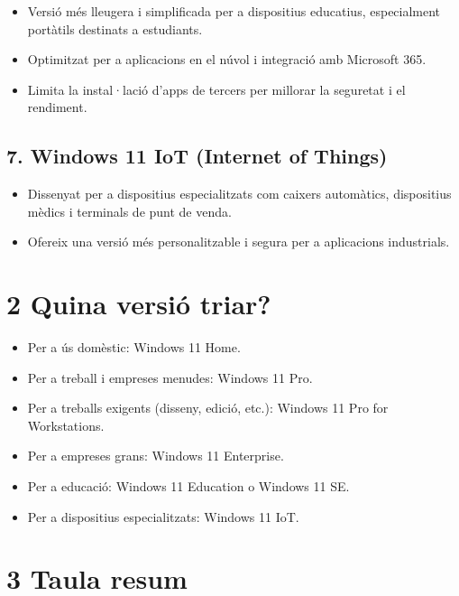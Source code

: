 \documentclass[
  12 pt,
  a4paper,
]{article}
\providecommand{\tightlist}{%
  \setlength{\itemsep}{0pt}\setlength{\parskip}{0pt}}
\begin{document}
\begin{itemize}
\tightlist
\item
  Versió més lleugera i simplificada per a dispositius educatius,
  especialment portàtils destinats a estudiants.
\item
  Optimitzat per a aplicacions en el núvol i integració amb Microsoft
  365.
\item
  Limita la instal·lació d'apps de tercers per millorar la seguretat i
  el rendiment.
\end{itemize}

\subsection{7. Windows 11 IoT (Internet of
Things)}\label{windows-11-iot-internet-of-things}

\begin{itemize}
\item
  Dissenyat per a dispositius especialitzats com caixers automàtics,
  dispositius mèdics i terminals de punt de venda.
\item
  Ofereix una versió més personalitzable i segura per a aplicacions
  industrials.
\end{itemize}

\newpage

\section{2 Quina versió triar?}\label{quina-versiuxf3-triar}

\begin{itemize}
\tightlist
\item
  Per a ús domèstic: Windows 11 Home.
\item
  Per a treball i empreses menudes: Windows 11 Pro.
\item
  Per a treballs exigents (disseny, edició, etc.): Windows 11 Pro for
  Workstations.
\item
  Per a empreses grans: Windows 11 Enterprise.
\item
  Per a educació: Windows 11 Education o Windows 11 SE.
\item
  Per a dispositius especialitzats: Windows 11 IoT.
\end{itemize}

\section{3 Taula resum}\label{taula-resum}
\end{document}
